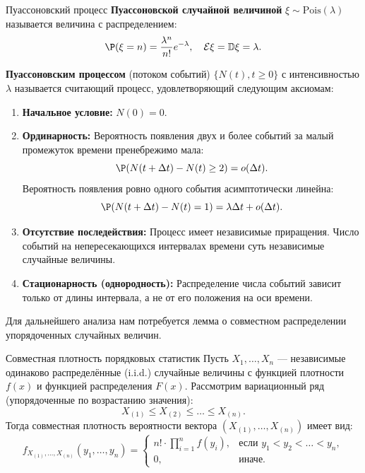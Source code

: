 \begin{definition}{Пуассоновский процесс}
\textbf{Пуассоновской случайной величиной} $\xi \sim \text{Pois}(\lambda)$ называется величина с распределением:
$$ \P(\xi = n) = \frac{\lambda^n}{n!} e^{-\lambda}, \quad \E\xi = \mathbb{D}\xi = \lambda. $$

\textbf{Пуассоновским процессом} (потоком событий) $\{N(t), t \ge 0\}$ с интенсивностью $\lambda$ называется считающий процесс, удовлетворяющий следующим аксиомам:
\begin{enumerate}
    \item \textbf{Начальное условие:} $N(0) = 0$.
    \item \textbf{Ординарность:} Вероятность появления двух и более событий за малый промежуток времени пренебрежимо мала:
    $$ \P(N(t + \Delta t) - N(t) \ge 2) = o(\Delta t). $$
    Вероятность появления ровно одного события асимптотически линейна:
    $$ \P(N(t + \Delta t) - N(t) = 1) = \lambda \Delta t + o(\Delta t). $$
    \item \textbf{Отсутствие последействия:} Процесс имеет независимые приращения. Число событий на непересекающихся интервалах времени суть независимые случайные величины.
    \item \textbf{Стационарность (однородность):} Распределение числа событий зависит только от длины интервала, а не от его положения на оси времени.
\end{enumerate}
\end{definition}

Для дальнейшего анализа нам потребуется лемма о совместном распределении упорядоченных случайных величин.

\begin{lemma}{Совместная плотность порядковых статистик}
Пусть $X_1, \dots, X_n$ — независимые одинаково распределённые (i.i.d.) случайные величины с функцией плотности $f(x)$ и функцией распределения $F(x)$.
Рассмотрим вариационный ряд (упорядоченные по возрастанию значения):
$$ X_{(1)} \le X_{(2)} \le \dots \le X_{(n)}. $$
Тогда совместная плотность вероятности вектора $(X_{(1)}, \dots, X_{(n)})$ имеет вид:
$$
f_{X_{(1)}, \dots, X_{(n)}}(y_1, \dots, y_n) =
\begin{cases}
    n! \cdot \prod_{i=1}^n f(y_i), & \text{если } y_1 < y_2 < \dots < y_n, \\
    0, & \text{иначе.}
\end{cases}
$$
\end{lemma}

